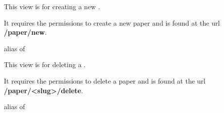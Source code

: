 \documentclass[letterpaper,10pt,english]{sphinxmanual}
\begin{document}

\begin{fulllineitems}
\label{papers:papers.views.PaperCreate}
This view is for creating a new {\hyperref[papers:papers.models.Publication]{}}.

It requires the permissions to create a new paper and is found at the url \textbf{/paper/new}.

\begin{fulllineitems}
\label{papers:papers.views.PaperCreate.model}
alias of 

\end{fulllineitems}


\end{fulllineitems}


\begin{fulllineitems}
\label{papers:papers.views.PaperDelete}
This view is for deleting a {\hyperref[papers:papers.models.Publication]{}}.

It requires the permissions to delete a paper and is found at the url \textbf{/paper/\textless{}slug\textgreater{}/delete}.

\begin{fulllineitems}
\label{papers:papers.views.PaperDelete.model}
alias of 

\end{fulllineitems}


\end{fulllineitems}

\end{document}
